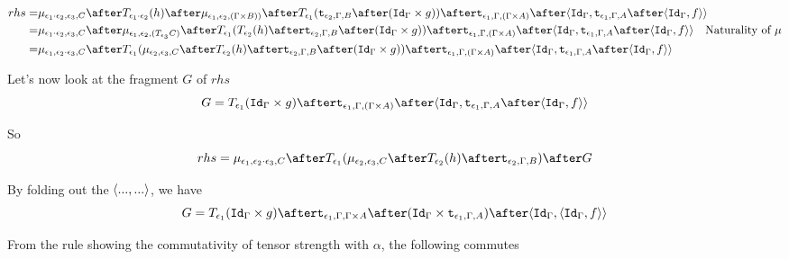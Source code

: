 \documentclass{report}
\begin{document}
\begin{equation}
    \begin{split}
        rhs = &\bind{\e_1\dot\e_2}{\e_3}{C}\after\T{\e_1\dot\e_2}{(h)}\after\bind{\e_1}{\e_2}{(\G \times B))} \after \T{\e_1}{(\tstrength{\e_2}{\G}{B} \after (\idg \times g))} \after \tstrength{\e_1}{\G}{(\G \times A)} \after \pr{\idg}{\tstrength{\e_1}{\G}{A}\after\pr{\idg}{f}}\\
        = &\bind{\e_1\dot\e_2}{\e_3}{C}\after\bind{\e_1}{\e_2}{(\T{\e_3}{C})}\after\T{\e_1}{(\T{\e_2}{(h)} \after \tstrength{\e_2}{\G}{B} \after (\idg \times g))} \after \tstrength{\e_1}{\G}{(\G \times A)} \after \pr{\idg}{\tstrength{\e_1}{\G}{A}\after\pr{\idg}{f}}\qt{Naturality of $\mu$}\\
        = & \bind{\e_1}{\e_2\dot\e_3}{C}\after\T{\e_1}{(\bind{\e_2}{\e_3}{C}\after \T{\e_2}{(h)} \after \tstrength{\e_2}{\G}{B} \after (\idg \times g))} \after \tstrength{\e_1}{\G}{(\G \times A)} \after \pr{\idg}{\tstrength{\e_1}{\G}{A}\after\pr{\idg}{f}}
    \end{split}
\end{equation}

Let's now look at the fragment $G$ of $rhs$
\begin{equation}
    G = \T{\e_1}{(\idg\times g)}\after\tstrength{\e_1}{\G}{(\G\times A)}\after\pr{\idg}{\tstrength{\e_1}{\G}{A}\after\pr{\idg}{f}}
\end{equation}

So
\begin{equation}
    rhs = \bind{\e_1}{\e_2\dot\e_3}{C}\after\T{\e_1}{(\bind{\e_2}{\e_3}{C}\after \T{\e_2}{(h)} \after \tstrength{\e_2}{\G}{B})}\after G
\end{equation}


By folding out the $\langle..., ...\rangle$, we have
\begin{equation}
    G = \T{\e_1}{(\idg\times g)}\after\tstrength{\e_1}{\G}{\G \times A}\after(\idg\times\tstrength{\e_1}{\G}{A})\after\pr{\idg}{\pr{\idg}{f}}
\end{equation}

From the rule  showing the commutativity of tensor strength with $\alpha$, the following commutes

\end{document}
